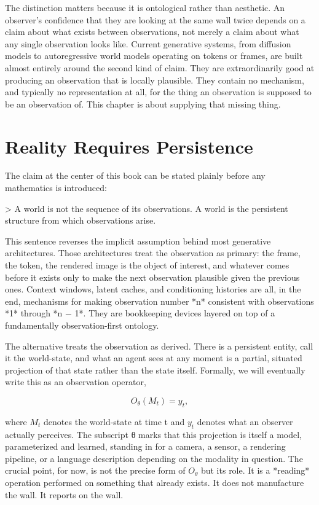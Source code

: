 The distinction matters because it is ontological rather than aesthetic. An observer's confidence that they are looking at the same wall twice depends on a claim about what exists between observations, not merely a claim about what any single observation looks like. Current generative systems, from diffusion models to autoregressive world models operating on tokens or frames, are built almost entirely around the second kind of claim. They are extraordinarily good at producing an observation that is locally plausible. They contain no mechanism, and typically no representation at all, for the thing an observation is supposed to be an observation of. This chapter is about supplying that missing thing.

\section{Reality Requires Persistence}

The claim at the center of this book can be stated plainly before any mathematics is introduced:

> A world is not the sequence of its observations. A world is the persistent structure from which observations arise.

This sentence reverses the implicit assumption behind most generative architectures. Those architectures treat the observation as primary: the frame, the token, the rendered image is the object of interest, and whatever comes before it exists only to make the next observation plausible given the previous ones. Context windows, latent caches, and conditioning histories are all, in the end, mechanisms for making observation number *n* consistent with observations *1* through *n − 1*. They are bookkeeping devices layered on top of a fundamentally observation-first ontology.

The alternative treats the observation as derived. There is a persistent entity, call it the world-state, and what an agent sees at any moment is a partial, situated projection of that state rather than the state itself. Formally, we will eventually write this as an observation operator,

\[ O_\theta(M_t) = y_t, \]

where \(M_t\) denotes the world-state at time t and \(y_t\) denotes what an observer actually perceives. The subscript θ marks that this projection is itself a model, parameterized and learned, standing in for a camera, a sensor, a rendering pipeline, or a language description depending on the modality in question. The crucial point, for now, is not the precise form of \(O_\theta\) but its role. It is a *reading* operation performed on something that already exists. It does not manufacture the wall. It reports on the wall.

